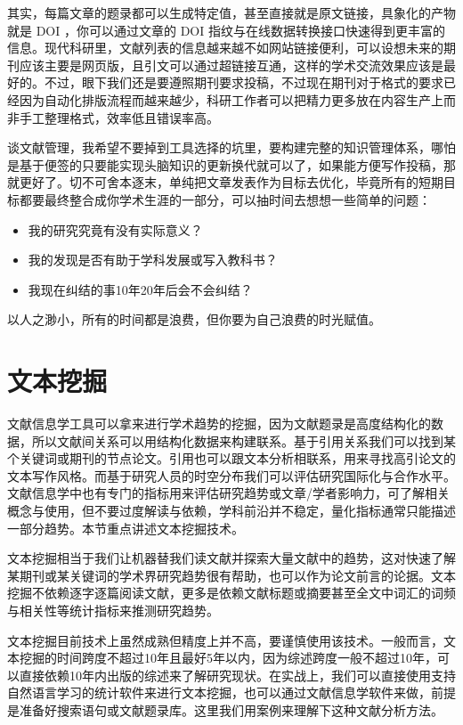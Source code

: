 \documentclass[]{tufte-book}
\providecommand{\tightlist}{%
  \setlength{\itemsep}{0pt}\setlength{\parskip}{0pt}}
\begin{document}
其实，每篇文章的题录都可以生成特定值，甚至直接就是原文链接，具象化的产物就是 DOI ，你可以通过文章的 DOI 指纹与在线数据转换接口快速得到更丰富的信息。现代科研里，文献列表的信息越来越不如网站链接便利，可以设想未来的期刊应该主要是网页版，且引文可以通过超链接互通，这样的学术交流效果应该是最好的。不过，眼下我们还是要遵照期刊要求投稿，不过现在期刊对于格式的要求已经因为自动化排版流程而越来越少，科研工作者可以把精力更多放在内容生产上而非手工整理格式，效率低且错误率高。

谈文献管理，我希望不要掉到工具选择的坑里，要构建完整的知识管理体系，哪怕是基于便签的只要能实现头脑知识的更新换代就可以了，如果能方便写作投稿，那就更好了。切不可舍本逐末，单纯把文章发表作为目标去优化，毕竟所有的短期目标都要最终整合成你学术生涯的一部分，可以抽时间去想想一些简单的问题：

\begin{itemize}
\tightlist
\item
  我的研究究竟有没有实际意义？
\item
  我的发现是否有助于学科发展或写入教科书？
\item
  我现在纠结的事10年20年后会不会纠结？
\end{itemize}

以人之渺小，所有的时间都是浪费，但你要为自己浪费的时光赋值。

\hypertarget{ux6587ux672cux6316ux6398}{%
\section{文本挖掘}\label{ux6587ux672cux6316ux6398}}

文献信息学工具可以拿来进行学术趋势的挖掘，因为文献题录是高度结构化的数据，所以文献间关系可以用结构化数据来构建联系。基于引用关系我们可以找到某个关键词或期刊的节点论文。引用也可以跟文本分析相联系，用来寻找高引论文的文本写作风格。而基于研究人员的时空分布我们可以评估研究国际化与合作水平。文献信息学中也有专门的指标用来评估研究趋势或文章/学者影响力，可了解相关概念与使用，但不要过度解读与依赖，学科前沿并不稳定，量化指标通常只能描述一部分趋势。本节重点讲述文本挖掘技术。

文本挖掘相当于我们让机器替我们读文献并探索大量文献中的趋势，这对快速了解某期刊或某关键词的学术界研究趋势很有帮助，也可以作为论文前言的论据。文本挖掘不依赖逐字逐篇阅读文献，更多是依赖文献标题或摘要甚至全文中词汇的词频与相关性等统计指标来推测研究趋势。

文本挖掘目前技术上虽然成熟但精度上并不高，要谨慎使用该技术。一般而言，文本挖掘的时间跨度不超过10年且最好5年以内，因为综述跨度一般不超过10年，可以直接依赖10年内出版的综述来了解研究现状。在实战上，我们可以直接使用支持自然语言学习的统计软件来进行文本挖掘，也可以通过文献信息学软件来做，前提是准备好搜索语句或文献题录库。这里我们用案例来理解下这种文献分析方法。
\end{document}

